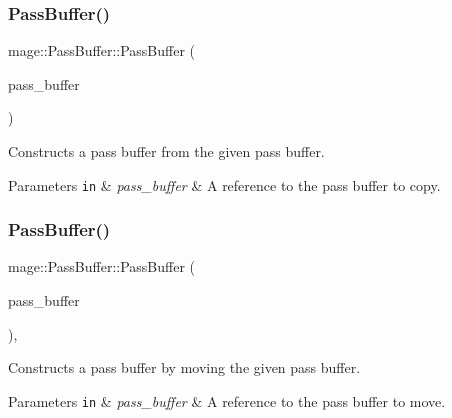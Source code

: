 \subsubsection{\texorpdfstring{Pass\+Buffer()}{PassBuffer()}\hspace{0.1cm}{\footnotesize\ttfamily [2/3]}}
{\footnotesize\ttfamily mage\+::\+Pass\+Buffer\+::\+Pass\+Buffer (\begin{DoxyParamCaption}\item[{const \hyperlink{structmage_1_1_pass_buffer}{Pass\+Buffer} \&}]{pass\+\_\+buffer }\end{DoxyParamCaption})\hspace{0.3cm}{\ttfamily [default]}}

Constructs a pass buffer from the given pass buffer.


\begin{DoxyParams}[1]{Parameters}
\mbox{\tt in}  & {\em pass\+\_\+buffer} & A reference to the pass buffer to copy. \\
\hline
\end{DoxyParams}
\hypertarget{structmage_1_1_pass_buffer_a2aee0227f8dab61b98f84d5024d2a06a}{}\label{structmage_1_1_pass_buffer_a2aee0227f8dab61b98f84d5024d2a06a} 
\subsubsection{\texorpdfstring{Pass\+Buffer()}{PassBuffer()}\hspace{0.1cm}{\footnotesize\ttfamily [3/3]}}
{\footnotesize\ttfamily mage\+::\+Pass\+Buffer\+::\+Pass\+Buffer (\begin{DoxyParamCaption}\item[{\hyperlink{structmage_1_1_pass_buffer}{Pass\+Buffer} \&\&}]{pass\+\_\+buffer }\end{DoxyParamCaption})\hspace{0.3cm}{\ttfamily [default]}, {\ttfamily [noexcept]}}

Constructs a pass buffer by moving the given pass buffer.


\begin{DoxyParams}[1]{Parameters}
\mbox{\tt in}  & {\em pass\+\_\+buffer} & A reference to the pass buffer to move. \\
\hline
\end{DoxyParams}
\hypertarget{structmage_1_1_pass_buffer_a650dec579522b7d5c5810a535b10773a}{}\label{structmage_1_1_pass_buffer_a650dec579522b7d5c5810a535b10773a} 
